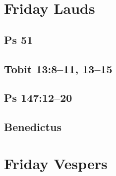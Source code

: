 {%
\parindent 0pt
\noindent
\ifx\preLilyPondExample \undefined
\else
  \expandafter\preLilyPondExample
\fi
\def\lilypondbook{}%

\ifx\postLilyPondExample \undefined
\else
  \expandafter\postLilyPondExample
\fi
}


\section{Friday Lauds}

\subsection{Ps 51}

{%
\parindent 0pt
\noindent
\ifx\preLilyPondExample \undefined
\else
  \expandafter\preLilyPondExample
\fi
\def\lilypondbook{}%

\ifx\postLilyPondExample \undefined
\else
  \expandafter\postLilyPondExample
\fi
}

\subsection{Tobit 13:8--11, 13--15}

{%
\parindent 0pt
\noindent
\ifx\preLilyPondExample \undefined
\else
  \expandafter\preLilyPondExample
\fi
\def\lilypondbook{}%

\ifx\postLilyPondExample \undefined
\else
  \expandafter\postLilyPondExample
\fi
}

\subsection{Ps 147:12--20}

{%
\parindent 0pt
\noindent
\ifx\preLilyPondExample \undefined
\else
  \expandafter\preLilyPondExample
\fi
\def\lilypondbook{}%

\ifx\postLilyPondExample \undefined
\else
  \expandafter\postLilyPondExample
\fi
}

\subsection{Benedictus}

{%
\parindent 0pt
\noindent
\ifx\preLilyPondExample \undefined
\else
  \expandafter\preLilyPondExample
\fi
\def\lilypondbook{}%

\ifx\postLilyPondExample \undefined
\else
  \expandafter\postLilyPondExample
\fi
}


\section{Friday Vespers}

